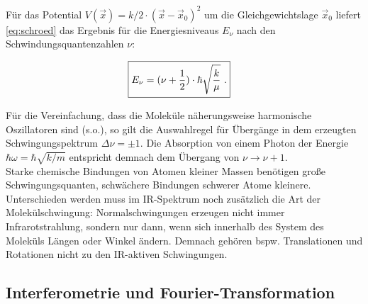 \documentclass[a4paper,10pt,twocolumn]{article}
\newcommand{\ix}[1]{_\text{#1}}
\begin{document}
		F\"ur das Potential $V(\vec{x})=k/2\cdot (\vec{x}-\vec{x}\ix{0})^{2}$ um die Gleichgewichtslage $\vec{x}\ix{0}$ liefert \autoref{eq:schroed} das Ergebnis f\"ur die Energiesniveaus $E_{\nu}$ nach den Schwindungsquantenzahlen $\nu$:
	
			\begin{align}
				\Aboxed{E_{\nu}=(\nu+\frac{1}{2})\cdot\hbar\sqrt{\frac{k}{\mu}}\,\, .
				}
			\end{align}
	
		F\"ur die Vereinfachung, dass die Molek\"ule n\"aherungsweise harmonische Oszillatoren sind (s.o.), so gilt die Auswahlregel f\"ur \"Uberg\"ange in dem erzeugten Schwingungspektrum $\Delta\nu=\pm1$. Die Absorption von einem Photon der Energie $\hbar\omega=\hbar\sqrt{k/m}$ entspricht demnach dem \"Ubergang von $\nu\rightarrow\nu+1$.\\
		Starke chemische Bindungen von Atomen kleiner Massen ben\"otigen gro{\ss}e Schwingungsquanten, schw\"achere Bindungen schwerer Atome kleinere.\\
		Unterschieden werden muss im IR-Spektrum noch zus\"atzlich die Art der Molek\"ulschwingung: Normalschwingungen erzeugen nicht immer Infrarotstrahlung, sondern nur dann, wenn sich innerhalb des System des Molek\"uls L\"angen oder Winkel \"andern. Demnach geh\"oren bspw. Translationen und Rotationen nicht zu den IR-aktiven Schwingungen.
	
	\subsection{Interferometrie und Fourier-Transformation}
	
\end{document}
